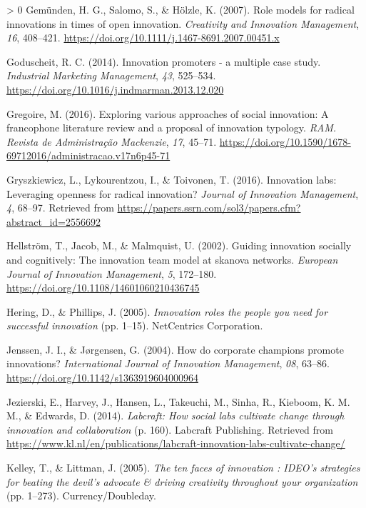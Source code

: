 \documentclass[]{elsarticle} %
\newlength{\cslhangindent}
\newenvironment{CSLReferences}[3] %
 {%
  \setlength{\parindent}{0pt}
  \ifodd #1 \everypar{\setlength{\hangindent}{\cslhangindent}}\ignorespaces\fi
  \ifnum #2 > 0
  \setlength{\parskip}{#2\baselineskip}
  \fi
 }%
 {}
\begin{document}
\begin{CSLReferences}{1}{0}
\leavevmode\hypertarget{ref-Gemunden2007}{}%
Gemünden, H. G., Salomo, S., \& Hölzle, K. (2007). Role models for
radical innovations in times of open innovation. \emph{Creativity and
Innovation Management}, \emph{16}, 408--421.
\url{https://doi.org/10.1111/j.1467-8691.2007.00451.x}

\leavevmode\hypertarget{ref-Goduscheit2014}{}%
Goduscheit, R. C. (2014). Innovation promoters - a multiple case study.
\emph{Industrial Marketing Management}, \emph{43}, 525--534.
\url{https://doi.org/10.1016/j.indmarman.2013.12.020}

\leavevmode\hypertarget{ref-Gregoire2016}{}%
Gregoire, M. (2016). Exploring various approaches of social innovation:
A francophone literature review and a proposal of innovation typology.
\emph{RAM. Revista de Administração Mackenzie}, \emph{17}, 45--71.
\url{https://doi.org/10.1590/1678-69712016/administracao.v17n6p45-71}

\leavevmode\hypertarget{ref-Gryszkiewicz2016}{}%
Gryszkiewicz, L., Lykourentzou, I., \& Toivonen, T. (2016). Innovation
labs: Leveraging openness for radical innovation? \emph{Journal of
Innovation Management}, \emph{4}, 68--97. Retrieved from
\url{https://papers.ssrn.com/sol3/papers.cfm?abstract_id=2556692}

\leavevmode\hypertarget{ref-Hellstrom2002}{}%
Hellström, T., Jacob, M., \& Malmquist, U. (2002). Guiding innovation
socially and cognitively: The innovation team model at skanova networks.
\emph{European Journal of Innovation Management}, \emph{5}, 172--180.
\url{https://doi.org/10.1108/14601060210436745}

\leavevmode\hypertarget{ref-Hering2005}{}%
Hering, D., \& Phillips, J. (2005). \emph{Innovation roles the people
you need for successful innovation} (pp. 1--15). NetCentrics
Corporation.

\leavevmode\hypertarget{ref-Jenssen2004}{}%
Jenssen, J. I., \& Jørgensen, G. (2004). How do corporate champions
promote innovations? \emph{International Journal of Innovation
Management}, \emph{08}, 63--86.
\url{https://doi.org/10.1142/s1363919604000964}

\leavevmode\hypertarget{ref-Jezierski2014}{}%
Jezierski, E., Harvey, J., Hansen, L., Takeuchi, M., Sinha, R., Kieboom,
K. M. M., \& Edwards, D. (2014). \emph{Labcraft: How social labs
cultivate change through innovation and collaboration} (p. 160).
Labcraft Publishing. Retrieved from
\url{https://www.kl.nl/en/publications/labcraft-innovation-labs-cultivate-change/}

\leavevmode\hypertarget{ref-Kelley2005}{}%
Kelley, T., \& Littman, J. (2005). \emph{The ten faces of innovation :
IDEO's strategies for beating the devil's advocate \& driving creativity
throughout your organization} (pp. 1--273). Currency/Doubleday.


\end{CSLReferences}
\end{document}
